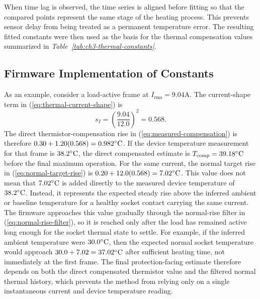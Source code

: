 When time lag is observed, the time series is aligned before fitting so that
the compared points represent the same stage of the heating process. This
prevents sensor delay from being treated as a permanent temperature error. The
resulting fitted constants were then used as the basis for the thermal
compensation values summarized in
\textit{Table~\ref{tab:ch3-thermal-constants}}.

\subsection{Firmware Implementation of Constants}
\label{sec:ch3-thermal-firmware-constants}

As an example, consider a load-active frame at $I_{\mathrm{rms}}=9.04\mathrm{A}$.
The current-shape term in (\ref{eq:thermal-current-shape}) is
\[
  s_I=\left(\frac{9.04}{12.0}\right)^2=0.568 .
\]
The direct thermistor-compensation rise in
(\ref{eq:measured-compensation}) is therefore
$0.30+1.20(0.568)=0.982^\circ\mathrm{C}$. If the device temperature measurement for that
frame is $38.2^\circ\mathrm{C}$, the direct compensated estimate is
$T_{\mathrm{comp}}=39.18^\circ\mathrm{C}$ before the final maximum operation. 
For the same current, the normal target rise in
(\ref{eq:normal-target-rise}) is
$0.20+12.0(0.568)=7.02^\circ\mathrm{C}$. This value does not mean that
$7.02^\circ\mathrm{C}$ is added directly to the measured device temperature of
$38.2^\circ\mathrm{C}$. Instead, it represents the expected steady rise above the
inferred ambient or baseline temperature for a healthy socket contact carrying
the same current. The firmware approaches this value gradually through the
normal-rise filter in (\ref{eq:normal-rise-filter}), so it is reached only
after the load has remained active long enough for the socket thermal state to
settle. For example, if the inferred ambient temperature were $30.0^\circ\mathrm{C}$,
then the expected normal socket temperature would approach
$30.0+7.02=37.02^\circ\mathrm{C}$ after sufficient heating time, not immediately at
the first frame. The final protection-facing estimate therefore depends on
both the direct compensated thermistor value and the filtered normal thermal
history, which prevents the method from relying only on a single instantaneous
current and device temperature reading.